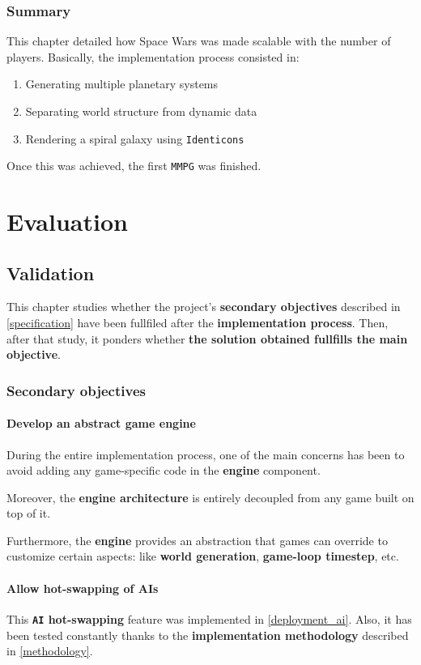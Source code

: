 \documentclass[a4paper,11pt,titlepage,abstract,numbers=noenddot,automark,mnsy,intlimits,rgb,dvipsnames]{report}
\begin{document}
\section{Summary}
This chapter detailed how Space Wars was made scalable with the number of players. Basically, the implementation
process consisted in:
\begin{enumerate}
\item
Generating multiple planetary systems
\item
Separating world structure from dynamic data
\item
Rendering a spiral galaxy using \texttt{Identicons}
\end{enumerate}
Once this was achieved, the first \texttt{MMPG} was finished.
\part{Evaluation}
\chapter{Validation}
\label{validation}
This chapter studies whether the project's \textbf{secondary objectives} described in \autoref{specification}
have been fullfiled after the \textbf{implementation process}. Then, after that study, it ponders whether
\textbf{the solution obtained fullfills the main objective}.
\section{Secondary objectives}
\subsection{Develop an abstract game engine}
During the entire implementation process, one of the main concerns has been to avoid adding any game-specific code
in the \textbf{engine} component.

Moreover, the \textbf{engine architecture} is entirely decoupled from any game built on
top of it.

Furthermore, the \textbf{engine} provides an abstraction that games can override to customize certain aspects:
like \textbf{world generation}, \textbf{game-loop timestep}, etc.
\subsection{Allow hot-swapping of AIs}
This \textbf{\texttt{AI} hot-swapping} feature was implemented in \autoref{deployment_ai}. Also, it has been tested constantly
thanks to the \textbf{implementation methodology} described in \autoref{methodology}.
\end{document}

